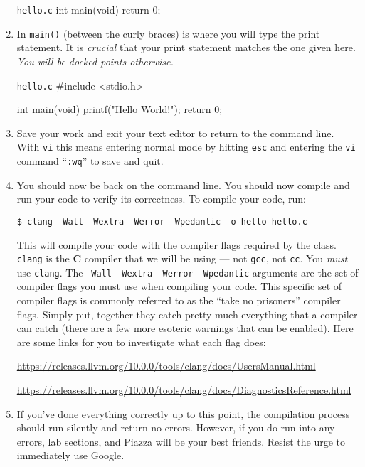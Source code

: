 \documentclass[11pt]{article}
\begin{document}
\begin{enumerate}
\begin{codelisting}{\texttt{hello.c}}
int main(void) {
    return 0;
}
\end{codelisting}

  \item In \texttt{main()} (between the curly braces) is where you will type the
    print statement. It is \emph{crucial} that your print statement matches the
    one given here. \emph{You will be docked points otherwise.}

\begin{codelisting}{\texttt{hello.c}}
#include <stdio.h>

int main(void) {
    printf("Hello World!\n");
    return 0;
}
\end{codelisting}

  \item Save your work and exit your text editor to return to the command line.
    With \texttt{vi} this means entering normal mode by hitting \texttt{esc} and
    entering the \texttt{vi} command ``\texttt{:wq}'' to save and quit.

  \item You should now be back on the command line. You should now compile and
    run your code to verify its correctness. To compile your code, run:

\begin{lstlisting}[style=bashstyle]
  $ clang -Wall -Wextra -Werror -Wpedantic -o hello hello.c
\end{lstlisting}

    This will compile your code with the compiler flags required by the class.
    \texttt{clang} is the \textbf{C} compiler that we will be using --- not
    \texttt{gcc}, not \texttt{cc}. You \emph{must} use \texttt{clang}. The
    \texttt{-Wall -Wextra -Werror -Wpedantic} arguments are the set of compiler
    flags you must use when compiling your code. This specific set of compiler
    flags is commonly referred to as the ``take no prisoners'' compiler flags.
    Simply put, together they catch pretty much everything that a compiler can
    catch (there are a few more esoteric warnings that can be enabled). Here are
    some links for you to investigate what each flag does:

    \centerline{\url{https://releases.llvm.org/10.0.0/tools/clang/docs/UsersManual.html}}
    \centerline{\url{https://releases.llvm.org/10.0.0/tools/clang/docs/DiagnosticsReference.html}}

  \item If you've done everything correctly up to this point, the compilation
    process should run silently and return no errors. However, if you do run
    into any errors, lab sections, and Piazza will be your best friends. Resist
    the urge to immediately use Google.


\end{enumerate}
\end{document}
